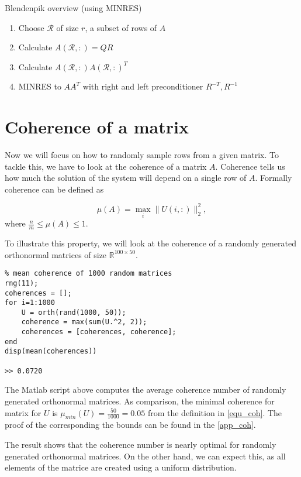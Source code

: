 \documentclass{article}
\begin{document}
\begin{algorithm}[htb]
\caption{Blendenpik overview (using MINRES)}
\begin{enumerate}
\item Choose $\mathcal{R}$ of size $r$, a subset of rows of $A$
\item Calculate $A(\mathcal{R},:) = QR$ 
\item Calculate $A(\mathcal{R}, :)A(\mathcal{R}, :)^T$
\item MINRES to $AA^T$ with right and left preconditioner $R^{-T}, R^{-1}$
\end{enumerate}
\end{algorithm}

\section{Coherence of a matrix}
Now we will focus on how to randomly sample rows from a given matrix. To tackle
this, we have to look at the coherence of a matrix $A$. Coherence tells us how
much the solution of the system will depend on a single row of $A$. Formally
coherence can be defined as

\begin{equation} \label{equ_coh}
\mu(A)=\max _{i}\|U(i,:)\|_{2}^{2},
\end{equation}
where $\frac{n}{m} \le \mu(A) \le 1$. 

\bigskip

To illustrate this property, we will look at the coherence of a randomly
generated orthonormal matrices of size $\mathbb{R}^{100 \times 50}$.

\begin{verbatim}
% mean coherence of 1000 random matrices
rng(11);
coherences = [];
for i=1:1000
    U = orth(rand(1000, 50));
    coherence = max(sum(U.^2, 2));
    coherences = [coherences, coherence];
end
disp(mean(coherences))

>> 0.0720
\end{verbatim}

The Matlab script above computes the average coherence number of randomly
generated orthonormal matrices. As comparison, the minimal coherence for matrix
for $U$ is $\mu_{min}(U)= \frac{50}{1000} = 0.05$ from the definition in
\ref{equ_coh}. The proof of the corresponding the bounds can be found in the
\ref{app_coh}.

The result shows that the coherence number is nearly optimal for randomly
generated orthonormal matrices. On the other hand, we can expect this, as all
elements of the matrice are created using a uniform distribution. 
\end{document}

